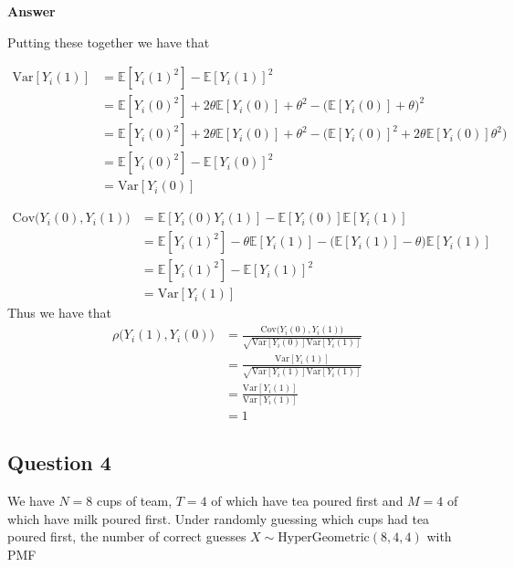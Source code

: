 \documentclass[
  11pt,
  letterpaper,
  DIV=11,
  numbers=noendperiod]{scrartcl}
\newcommand{\var}{\text{Var}}
\newcommand{\cov}{\text{Cov}}
\newcommand{\hypg}{\text{HyperGeometric}}
\begin{document}
\begin{tcolorbox}[enhanced jigsaw, arc=.35mm, colback=white, bottomrule=.15mm, breakable, opacityback=0, rightrule=.15mm, toprule=.15mm, leftrule=.75mm, left=2mm, colframe=quarto-callout-note-color-frame]

\textbf{Answer}\vspace{2mm}

Putting these together we have that

\[
\begin{aligned}
\var[Y_i(1)] &= \mathbb{E}[Y_i(1)^2] - \mathbb{E}[Y_i(1)]^2 \\
&= \mathbb{E}[Y_i(0)^2] +  2\theta\mathbb{E}[Y_i(0)] + \theta^2 - \biggr(\mathbb{E}[Y_i(0)] + \theta\biggr)^2 \\
&= \mathbb{E}[Y_i(0)^2] +  2\theta\mathbb{E}[Y_i(0)] + \theta^2 - \biggr(\mathbb{E}[Y_i(0)]^2 +  2\theta\mathbb{E}[Y_i(0)]\theta^2\biggr) \\
&= \mathbb{E}[Y_i(0)^2]- \mathbb{E}[Y_i(0)]^2 \\
&= \var[Y_i(0)]
\end{aligned}
\]

\[
\begin{aligned}
\cov\biggr(Y_i(0), Y_i(1)\biggr) &= \mathbb{E}[Y_i(0)Y_i(1)] - \mathbb{E}[Y_i(0)]\mathbb{E}[Y_i(1)] \\
&= \mathbb{E}[Y_i(1)^2] - \theta\mathbb{E}[Y_i(1)] - \biggr(\mathbb{E}[Y_i(1)] - \theta\biggr)\mathbb{E}[Y_i(1)] \\
&= \mathbb{E}[Y_i(1)^2] - \mathbb{E}[Y_i(1)]^2 \\
&= \var[Y_i(1)]
\end{aligned}
\] Thus we have that \[
\begin{aligned}
\rho\biggr(Y_i(1), Y_i(0)\biggr) &= \frac{\cov\biggr(Y_i(0), Y_i(1)\biggr)}{\sqrt{\var[Y_i(0)]\var[Y_i(1)]}} \\
&= \frac{\var[Y_i(1)]}{\sqrt{\var[Y_i(1)]\var[Y_i(1)]}} \\
&= \frac{\var[Y_i(1)]}{\var[Y_i(1)]} \\
&= 1
\end{aligned}
\]

\end{tcolorbox}

\hypertarget{question-4}{%
\subsection{Question 4}\label{question-4}}

We have \(N = 8\) cups of team, \(T = 4\) of which have tea poured first
and \(M = 4\) of which have milk poured first. Under randomly guessing
which cups had tea poured first, the number of correct guesses
\(X \sim \hypg(8, 4, 4)\) with PMF
\end{document}
